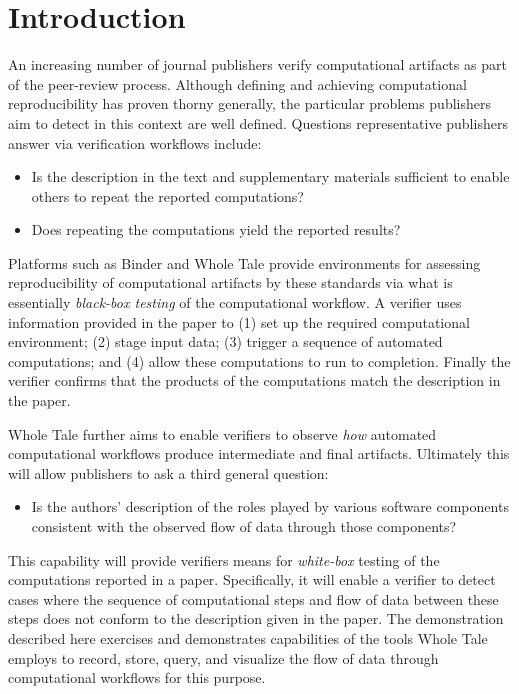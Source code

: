 \section{Introduction}

An increasing number of journal publishers verify computational artifacts as part of the peer-review process. Although defining and achieving computational reproducibility has proven thorny generally, the particular problems publishers aim to detect in this context are well defined. Questions representative publishers answer via verification workflows include:

\begin{itemize}[label=\raisebox{0.25ex}{\tiny$\bullet$}]

\item Is the description in the text and supplementary materials sufficient to enable others to repeat the reported computations?

\item Does repeating the computations yield the reported results?

\end{itemize}

Platforms such as Binder \cite{Binder_2018} and Whole Tale  \cite{brinckman2019computing} provide environments for assessing reproducibility of computational artifacts by these standards via what is essentially \emph{black-box testing} of the computational workflow. A verifier uses information provided in the paper to (1) set up the required computational environment; (2) stage input data; (3) trigger a sequence of automated computations; and (4) allow these computations to run to completion. Finally the verifier confirms that the products of the computations match the description in the paper.

Whole Tale further aims to enable verifiers to observe \emph{how} automated computational workflows produce intermediate and final artifacts. Ultimately this will allow publishers to ask a third general question:

\begin{itemize}[label=\raisebox{0.25ex}{\tiny$\bullet$}]

\item Is the authors' description of the roles played by various software components consistent with the observed flow of data through those components?

\end{itemize}

This capability will provide verifiers means for \emph{white-box} testing of the computations reported in a paper. Specifically, it will enable a verifier to detect cases where the sequence of computational steps and flow of data between these steps does not conform to the description given in the paper. The demonstration described here exercises and demonstrates capabilities of the tools Whole Tale employs to record, store, query, and visualize the flow of data through computational workflows for this purpose.








